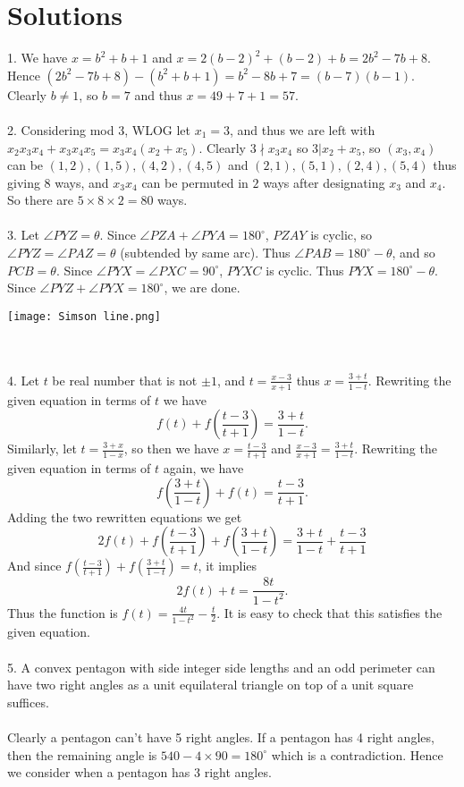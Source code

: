 \documentclass{article}
\begin{document}
\section{Solutions} 
1. We have $x=b^2+b+1$ and $x=2(b-2)^2+(b-2)+b=2b^2-7b+8$. Hence $(2b^2-7b+8)-(b^2+b+1)=b^2-8b+7=(b-7)(b-1)$. Clearly $b \neq 1$, so $b=7$ and thus $x=49+7+1=57.$ \\\\
2. Considering mod 3, WLOG let $x_1 = 3$, and thus we are left with $x_2x_3x_4 + x_3x_4x_5 = x_3x_4(x_2 + x_5).$ Clearly $3 \nmid x_3x_4$ so $3 \vert x_2+x_5$, so $(x_3,x_4)$ can be $(1,2), (1,5), (4,2), (4,5)$ and $(2,1), (5,1), (2,4), (5,4)$ thus giving 8 ways, and $x_3x_4$ can be permuted in $2$ ways after designating $x_3$ and $x_4$. So there are $5 \times 8 \times 2 = 80$ ways.\\\\
3. Let $\angle PYZ = \theta$. Since $\angle PZA + \angle PYA = 180^{\circ}$, $PZAY$ is cyclic, so $\angle PYZ = \angle PAZ = \theta$ (subtended by same arc). Thus $\angle PAB = 180^{\circ} - \theta$, and so $PCB = \theta$. Since $\angle PYX = \angle PXC = 90^{\circ}$, $PYXC$ is cyclic. Thus $PYX = 180^{\circ}-\theta$. Since $\angle PYZ + \angle PYX = 180^{\circ}$, we are done. \\ \centerline{\texttt{[image: Simson line.png]}}\\\\
4. Let $t$ be real number that is not $\pm 1$, and $t=\frac{x-3}{x+1}$ thus $x=\frac{3+t}{1-t}$. Rewriting the given equation in terms of $t$ we have $$f(t)+f(\frac{t-3}{t+1})=\frac{3+t}{1-t}.$$ Similarly, let $t=\frac{3+x}{1-x}$, so then we have $x=\frac{t-3}{t+1}$ and $\frac{x-3}{x+1}=\frac{3+t}{1-t}$. Rewriting the given equation in terms of $t$ again, we have $$f(\frac{3+t}{1-t}) + f(t)=\frac{t-3}{t+1}.$$ Adding the two rewritten equations we get $$2f(t)+f(\frac{t-3}{t+1})+f(\frac{3+t}{1-t})=\frac{3+t}{1-t}+\frac{t-3}{t+1}$$ And since $f(\frac{t-3}{t+1})+f(\frac{3+t}{1-t})=t$, it implies $$2f(t)+t=\frac{8t}{1-t^2}.$$ Thus the function is $f(t)=\frac{4t}{1-t^2}-\frac{t}{2}$. It is easy to check that this satisfies the given equation.  \\\\
5. A convex pentagon with side integer side lengths and an odd perimeter can have two right angles as a unit equilateral triangle on top of a unit square suffices. \\\\ Clearly a pentagon can't have 5 right angles. If a pentagon has 4 right angles, then the remaining angle is $540-4\times 90=180^{\circ}$ which is a contradiction. Hence we consider when a pentagon has 3 right angles. \\\\
\end{document}
